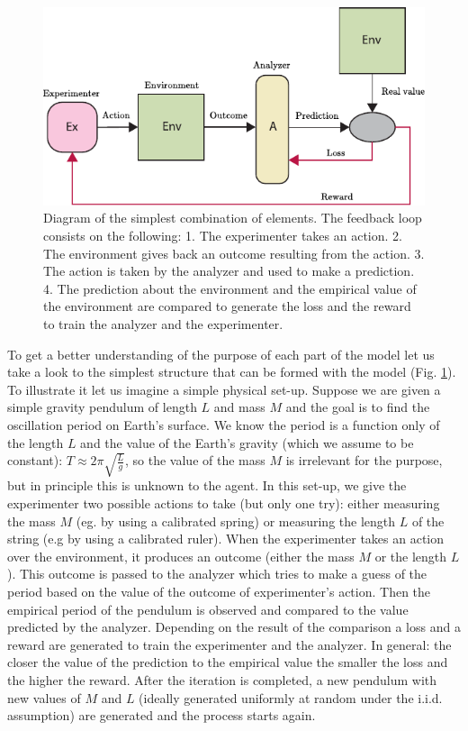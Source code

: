 \documentclass[11pt,a4paper,twoside]{report}
\newcommand{\+}{\textnormal{+} }
\theoremstyle{definition}
\numberwithin{equation}{chapter}
\begin{document}
\begin{figure}
  \centering
  \includegraphics{figures/SimpleSetUp.pdf}
  \caption{Diagram of the simplest combination of elements. The feedback loop
  consists on the following: 1. The experimenter takes an action. 2. The
  environment gives back an outcome resulting from the action. 3. The action is
  taken by the analyzer and used to make a prediction. 4. The prediction about
  the environment and the empirical value of the environment are compared to
  generate the loss and the reward to train the analyzer and the experimenter.}
  \label{fig:simplesetup}
\end{figure}

To get a better understanding of the purpose of each part of the model let us
take a look to the simplest structure that can be formed with the model (Fig.
\ref{fig:simplesetup}). To illustrate it let us imagine a simple physical
set-up. Suppose we are given a simple gravity pendulum of length $L$ and mass
$M$ and the goal is to find the oscillation period on Earth's surface. We know
the period is a function only of the length $L$ and the value of the Earth's
gravity (which we assume to be constant): $T \approx 2\pi\sqrt{\frac{L}{g}}$, so
the value of the mass $M$ is irrelevant for the purpose, but in principle this
is unknown to the agent. In this set-up, we give the experimenter two possible
actions to take (but only one try): either measuring the mass $M$ (eg. by using
a calibrated spring) or measuring the length $L$ of the string (e.g by using a
calibrated ruler). When the experimenter takes an action over the environment,
it produces an outcome (either the mass $M$ or the length $L$). This outcome is
passed to the analyzer which tries to make a guess of the period based on the
value of the outcome of experimenter's action. Then the empirical period of
the pendulum is observed and compared to the value predicted by the analyzer.
Depending on the result of the comparison a loss and a reward are generated to
train the experimenter and the analyzer. In general: the closer the value of the
prediction to the empirical value the smaller the loss and the higher the reward.
After the iteration is completed, a new pendulum with new values of $M$ and $L$
(ideally generated uniformly at random under the i.i.d. assumption) are
generated and the process starts again.
\end{document}
